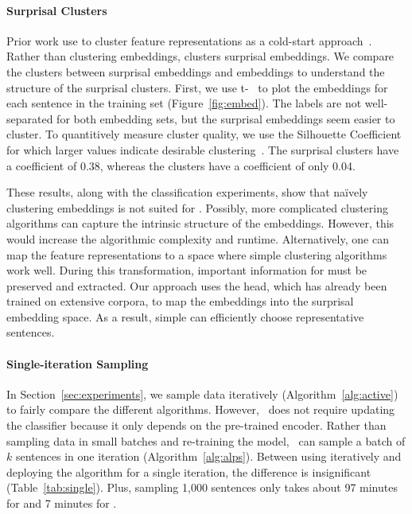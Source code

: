 \paragraph{Surprisal Clusters}

Prior work use \km{} to cluster feature representations as a cold-start
\al{} approach~\citep{zhu-2008,zalan-2011}.
Rather than clustering \bert{} embeddings, \alps{} clusters
surprisal embeddings.
We compare the clusters between surprisal embeddings and \bert{} embeddings to
understand the structure of the surprisal clusters.
First, we use t-~\citep{maaten-2008} to plot the embeddings for each sentence
in the
 training set (Figure~\ref{fig:embed}).
The labels are not well-separated for both embedding sets, but
the surprisal embeddings seem easier to cluster.
To quantitively measure
cluster quality, we use the Silhouette Coefficient for which larger values indicate
desirable clustering~\citep{rousseeuw-1987}. The surprisal clusters have
a coefficient of 0.38, whereas the \bert{} clusters have a coefficient of only 0.04.

These results, along with the classification experiments, show that
na\"ively clustering \bert{} embeddings is not suited for \al{}.
Possibly, more complicated clustering algorithms can capture the
intrinsic structure of the \bert{} embeddings.  However, this would increase
the algorithmic complexity and runtime.
Alternatively, one can map the feature representations to a space where simple
clustering algorithms work well.  During this transformation,
important information
for \al{} must be preserved and extracted.
Our approach uses the \mlm{} head, which has already been trained on
extensive corpora, to map the \bert{} embeddings into the surprisal
embedding space.  As a result, simple \km{} can efficiently choose representative
sentences.





\paragraph{Single-iteration Sampling}

In Section~\ref{sec:experiments}, we sample data iteratively
(Algorithm~\ref{alg:active}) to fairly compare the
different \al{} algorithms.  However, \alps~does not require
updating
the classifier because it only depends on the pre-trained encoder.  Rather than
sampling data in small batches and re-training the model, \alps~can sample a
batch of $k$ sentences in one iteration (Algorithm~\ref{alg:alps}).
Between using \alps{} iteratively and deploying the algorithm for a single iteration, the
difference is insignificant (Table~\ref{tab:single}). Plus, sampling 1{,}000
sentences only takes about 97 minutes for \pubmed{} and 7 minutes for .

